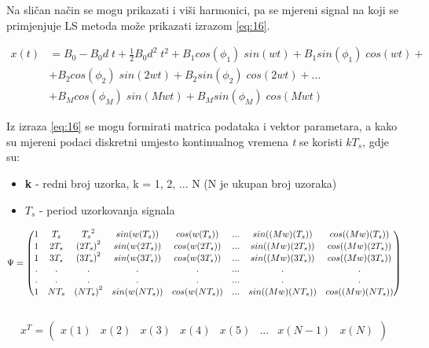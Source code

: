 Na sličan način se mogu prikazati i viši harmonici, pa se mjereni signal na koji se primjenjuje LS metoda može prikazati izrazom \ref{eq:16}. 

\begin{equation}
    \begin{split}
    x(t) & = B_0 - B_0 d\;t + \frac{1}{2} B_0 d^2\;t^2 + B_1cos(\phi_1)\;sin(wt) + B_1sin(\phi_1)\;cos(wt) + \\ 
    & + B_2cos(\phi_2)\;sin(2wt) + B_2sin(\phi_2)\;cos(2wt) + ... \\ 
    & + B_Mcos(\phi_M)\;sin(Mwt) + B_Msin(\phi_M)\;cos(Mwt)
    \end{split}
    \label{eq:16}
\end{equation}

Iz izraza \ref{eq:16} se mogu formirati matrica podataka i vektor parametara, a kako su mjereni podaci diskretni umjesto kontinualnog vremena \textit{t} se koristi \textit{$kT_s$}, gdje su:

\begin{itemize}
    \item \textbf{k} - redni broj uzorka, k = 1, 2, ... N (N je ukupan broj uzoraka)
    \item \textbf{$T_s$} - period uzorkovanja signala
\end{itemize}
\begin{equation}
\scalebox{0.89}{$\Psi = 
    \begin{pmatrix}
    1 & T_s  & {T_s}^2    & sin(w(T_s))  & cos(w(T_s))  & ... & sin((Mw)(T_s))  & cos((Mw)(T_s))  \\
    1 & 2T_s & {(2T_s)}^2 & sin(w(2T_s)) & cos(w(2T_s)) & ... & sin((Mw)(2T_s)) & cos((Mw)(2T_s)) \\
    1 & 3T_s & {(3T_s)}^2 & sin(w(3T_s)) & cos(w(3T_s)) & ... & sin((Mw)(3T_s)) & cos((Mw)(3T_s)) \\
    . & .      & .            & .              & .              & ... & .                 & .                 \\
    . & .      & .            & .              & .              & ... & .                 & .                 \\
    1 & NT_s & {(NT_s)}^2 & sin(w(NT_s)) & cos(w(NT_s)) & ... & sin((Mw)(NT_s)) & cos((Mw)(NT_s)) 
    \end{pmatrix}$}
\end{equation}
\\

\begin{equation}
    x^T = 
    \begin{pmatrix}
    x(1) & x(2)  & x(3)  & x(4)  & x(5)  & ... & x(N-1)  & x(N) 
    \end{pmatrix}
\end{equation}

